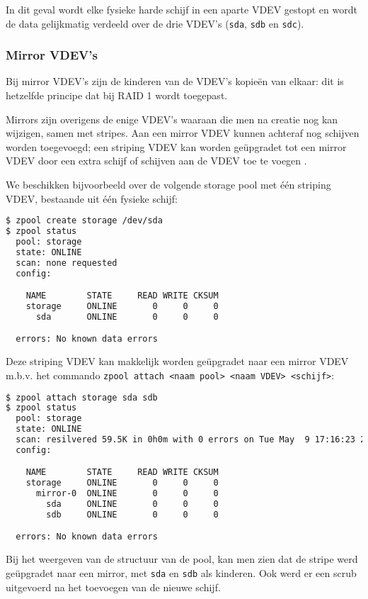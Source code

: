In dit geval wordt elke fysieke harde schijf in een aparte VDEV gestopt en wordt de data gelijkmatig verdeeld over de drie VDEV's (\texttt{sda}, \texttt{sdb} en \texttt{sdc}).

\subsubsection{Mirror VDEV's}

Bij mirror VDEV's zijn de kinderen van de VDEV's kopieën van elkaar: dit is hetzelfde principe dat bij RAID 1 wordt toegepast. 

Mirrors zijn overigens de enige VDEV's waaraan die men na creatie nog kan wijzigen, samen met stripes. Aan een mirror VDEV kunnen achteraf nog schijven worden toegevoegd; een \gls{striping} VDEV kan worden geüpgradet tot een mirror VDEV door een extra schijf of schijven aan de VDEV toe te voegen \autocite{FBSDDP2017}.

We beschikken bijvoorbeeld over de volgende storage pool met één \gls{striping} VDEV, bestaande uit één fysieke schijf:

\begin{lstlisting}[language=bash,style=command_style]
$ zpool create storage /dev/sda
$ zpool status
  pool: storage
  state: ONLINE
  scan: none requested
  config:

	NAME        STATE     READ WRITE CKSUM
	storage     ONLINE       0     0     0
	  sda       ONLINE       0     0     0

  errors: No known data errors
\end{lstlisting}

Deze \gls{striping} VDEV kan makkelijk worden geüpgradet naar een mirror VDEV m.b.v. het commando \texttt{zpool attach <naam pool> <naam VDEV> <schijf>}:

\begin{lstlisting}[language=bash,style=command_style]
$ zpool attach storage sda sdb
$ zpool status
  pool: storage
  state: ONLINE
  scan: resilvered 59.5K in 0h0m with 0 errors on Tue May  9 17:16:23 2017
  config:

	NAME        STATE     READ WRITE CKSUM
	storage     ONLINE       0     0     0
	  mirror-0  ONLINE       0     0     0
	    sda     ONLINE       0     0     0
	    sdb     ONLINE       0     0     0

  errors: No known data errors
\end{lstlisting}

Bij het weergeven van de structuur van de pool, kan men zien dat de stripe werd geüpgradet naar een mirror, met \texttt{sda} en \texttt{sdb} als kinderen. Ook werd er een scrub uitgevoerd na het toevoegen van de nieuwe schijf.

